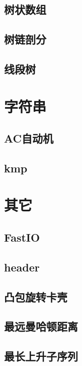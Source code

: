 \documentclass[twocolumn,a4,twoside]{book}
\begin{document}
		\section{树状数组}
		
		\section{树链剖分}
		
		\section{线段树}
		
	
	
	\chapter{字符串}
		\section{AC自动机}
		
		\section{kmp}
		
		
	\chapter{其它}
		\section{FastIO}
		
		\section{header}
		
		\section{凸包旋转卡壳}
		
		\section{最远曼哈顿距离}
		
		\section{最长上升子序列}
		
\end{document}
